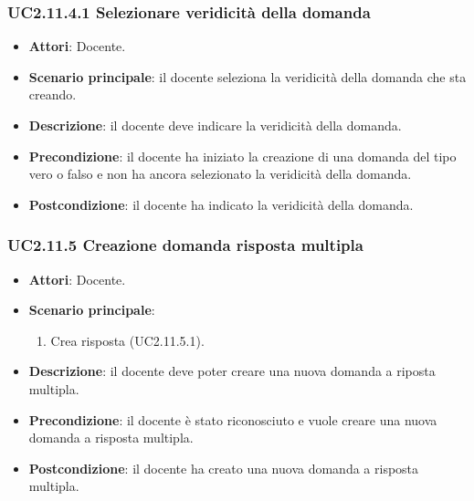 \subsubsection{UC2.11.4.1 Selezionare veridicità della domanda}
\begin{itemize}
\item \textbf{Attori}: Docente.
\item \textbf{Scenario principale}: il docente seleziona la veridicità della domanda che sta creando.
\item \textbf{Descrizione}: il docente deve indicare la veridicità della domanda.
\item \textbf{Precondizione}: il docente ha iniziato la creazione di una domanda del tipo vero o falso e non ha ancora selezionato la veridicità della domanda.
\item \textbf{Postcondizione}: il docente ha indicato la veridicità della domanda.
\end{itemize}
\subsubsection{UC2.11.5 Creazione domanda risposta multipla}
\begin{itemize}
\item \textbf{Attori}: Docente.
\item \textbf{Scenario principale}:
\begin{enumerate}
\item Crea risposta (UC2.11.5.1).
\end{enumerate}
\item \textbf{Descrizione}: il docente deve poter creare una nuova domanda a riposta multipla.
\item \textbf{Precondizione}: il docente è stato riconosciuto e vuole creare una nuova domanda a risposta multipla.
\item \textbf{Postcondizione}: il docente ha creato una nuova domanda a risposta multipla.
\end{itemize}
